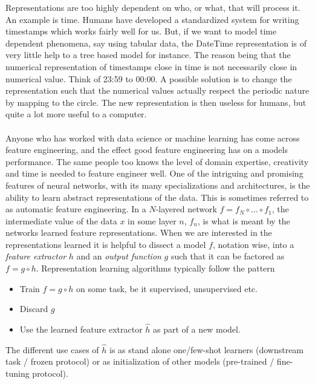 \documentclass[../../thesis.tex]{subfiles}
\begin{document}
Representations are too highly dependent on who, or what, that will process it. An example is time. Humans have developed a standardized system for writing timestamps which works fairly well for us. But, if we want to model time dependent phenomena, say using tabular data, the DateTime representation is of very little help to a tree based model for instance. The reason being that the numerical representation of timestamps close in time is not necessarily close in numerical value. Think of 23:59 to 00:00. A possible solution is to change the representation such that the numerical values actually respect the periodic nature by mapping to the circle. The new representation is then useless for humans, but quite a lot more useful to a computer. \\\\

Anyone who has worked with data science or machine learning has come across feature engineering, and the effect good feature engineering has on a models performance. The same people too knows the level of domain expertise, creativity and time is needed to feature engineer well. One of the intriguing and promising features of neural networks, with its many specializations and architectures, is the ability to learn abstract representations of the data. This is sometimes referred to as automatic feature engineering.  In a $N$-layered network $f = f_N\circ ...\circ f_1$, the intermediate value of the data $x$ in some layer $n$, $f_n$, is what is meant by the networks learned feature representations. When we are interested in the representations learned it is helpful to dissect a model $f$, notation wise, into a \textit{feature extractor} $h$ and an \textit{output function}  $g$ such that it can be factored as $f = g \circ h$. Representation learning algorithms typically follow the pattern
\begin{itemize}
    \item Train $f= g \circ h$ on some task, be it supervised, unsupervised etc.
    \item Discard $g$
    \item Use the learned feature extractor $\widehat{h}$ as part of a new model. 
\end{itemize}


The different use cases of $\widehat{h}$ is as stand alone one/few-shot learners (downstream task / frozen protocol) or as initialization of other models (pre-trained / fine-tuning protocol). \newline
\end{document}
